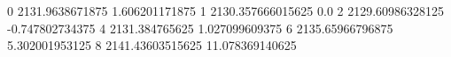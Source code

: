 0 2131.9638671875 1.606201171875
1 2130.357666015625 0.0
2 2129.60986328125 -0.747802734375
4 2131.384765625 1.027099609375
6 2135.65966796875 5.302001953125
8 2141.43603515625 11.078369140625
